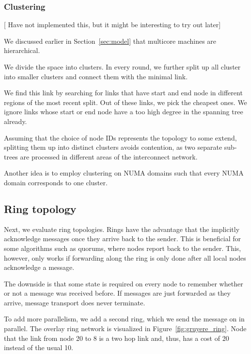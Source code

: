 \documentclass{article}
\newcommand{\stefan}[1]{
  {\color{skRed}[{\color{red}{SK}} #1]}}
\begin{document}
\subsubsection{Clustering}

\stefan{Have not implemented this, but it might be interesting to try
  out later}

We discussed earlier in Section~\ref{sec:model} that
multicore machines are hierarchical.%

We divide the space into clusters. In every round, we further split up
all cluster into smaller clusters and connect them with the minimal
link. 

We find this link by searching for links that have start and
end node in different regions of the most recent split. Out of these
links, we pick the cheapest ones. We ignore links whose start or end
node have a too high degree in the spanning tree already.

Assuming that the choice of node IDs represents the topology to some
extend, splitting them up into distinct clusters avoids contention, as
two separate sub-trees are processed in different areas of the
interconnect network.

Another idea is to employ clustering on NUMA domains such that every
NUMA domain corresponds to one cluster. 

\subsection{Ring topology}

Next, we evaluate ring topologies. Rings have the advantage that the
implicitly acknowledge messages once they arrive back to the
sender. This is beneficial for some algorithms such as quorums, where
nodes report back to the sender. This, however, only works if forwarding
along the ring is only done after all local nodes acknowledge a
message.

The downside is that some state is required on every node to remember
whether or not a message was received before. If messages are just
forwarded as they arrive, message transport does never terminate.

To add more parallelism, we add a second ring, which we send the
message on in parallel. The overlay ring network is visualized in
Figure~\ref{fig:gruyere_ring}. Node that the link from node 20 to 8 is
a two hop link and, thus, has a cost of 20 instead of the usual 10.
\end{document}
